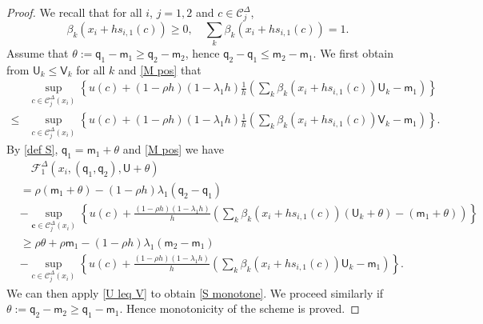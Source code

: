 \documentclass[11pt]{article}
\numberwithin{equation}{section}
\theoremstyle{Claim}
\newcommand{\mC}{\mathcal C}
\def\bq{{\mathsf{q}}}
\def\bm{{\mathsf{m}}}
\def\sU{{\mathsf{U}}}
\def\sV{{\mathsf{V}}}
\newcommand{\bc}{\mathbf{c}}
\newcommand{\beq}{\begin{equation}}
\newcommand{\eeq}{\end{equation}}
\theoremstyle{plain}
\newcommand{\D}{\Delta}
\begin{document}
\begin{proof}
We recall that for all $i$, $j=1,2$ and $c \in \mC^{\D}_{j}$,
\beq\label{M pos}
\beta_k(x_i+hs_{i,1}(c))\ge 0, \quad \sum_k \beta_k(x_i+hs_{i,1}(c))=1.
\eeq
Assume that $\theta:=\bq_1-\bm_1\ge \bq_2-\bm_2$, hence $\bq_2-\bq_1\le \bm_2-\bm_1$. We first obtain from $\sU_k\le \sV_k$ for all $k$ and \cref{M pos} that
\beq\label{U leq V}
\begin{aligned}
&\sup_{c\in \mC^{\D}_{j}(x_i)}\left\{
	u(c)+(1-\rho h)(1-\lambda_1h)\frac{1}{h}\left(\sum_k \beta_k(x_i+hs_{i,1}(c))\sU_k-\bm_1\right)\right\}\\
\leq {}&
\sup_{c\in \mC^{\D}_{j}(x_i)}\left\{
	u(c)+(1-\rho h)(1-\lambda_1h)\frac{1}{h}\left(\sum_k \beta_k(x_i+hs_{i,1}(c))\sV_k-\bm_1\right)\right\}.
\end{aligned}
\eeq
By \cref{def S}, $\bq_1=\bm_1+\theta$ and \cref{M pos} we have
\begin{align*}
&\quad \mathcal{F}^\D_1(x_i,(\bq_1,\bq_2), \sU+\theta)\\
&=\rho(\bm_1+\theta)-(1-\rho h)\lambda_1(\bq_2-\bq_1)\\
       &-\sup_{\bc\in \mC^{\D}_{j}(x_i)}\left\{
	u(c)+\frac{(1-\rho h)(1-\lambda_1h)}{h}\left(\sum_k \beta_k(x_i+hs_{i,1}(c))(\sU_k+\theta)-(\bm_1+\theta)  \right)\right\}\\
	&\geq \rho \theta+\rho \bm_1-(1-\rho h)\lambda_1(\bm_2-\bm_1)\\
       &-\sup_{c\in \mC^{\D}_{j}(x_i)}\left\{
	u(c)+\frac{(1-\rho h)(1-\lambda_1h)}{h}\left(\sum_k \beta_k(x_i+hs_{i,1}(c))\sU_k-\bm_1\right)\right\}.
\end{align*}
We can then apply \cref{U leq V} to obtain \cref{S monotone}. We proceed similarly if $\theta:=\bq_2-\bm_2\ge \bq_1-\bm_1$. Hence monotonicity of the scheme is proved.\par
 \end{proof}
 
\end{document}
